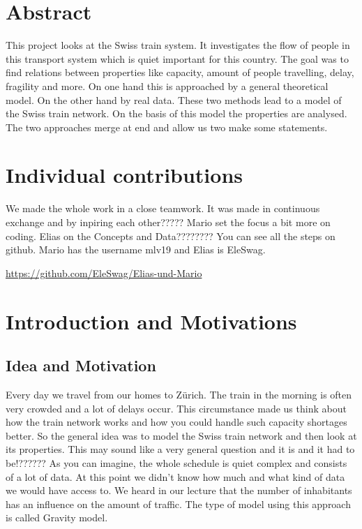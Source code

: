\documentclass[11pt]{article}
\begin{document}
\section{Abstract}

This project looks at the Swiss train system. It investigates the flow of people in this transport system which is quiet important for this country. The goal was to find relations between properties like capacity, amount of people travelling, delay, fragility and more. On one hand this is approached  by a general theoretical model. On the other hand by real data. These two methods lead to a model of the Swiss train  network. On the basis of this model the properties are analysed. The two approaches merge at end and allow us two make some statements.
 

\section{Individual contributions}

We made the whole work in a close teamwork. It was made in continuous exchange and by inpiring each other????? Mario set the focus a bit more on coding. Elias on the Concepts and Data???????? You can see all the steps on github. Mario has the username mlv19 and Elias is EleSwag.\newline

\url{https://github.com/EleSwag/Elias-und-Mario}

\section{Introduction and Motivations}

\subsection{Idea and Motivation}


Every day we travel from our homes to Z\"urich. The train in the morning is often very crowded and a lot of delays occur. This circumstance made us think about how the train network works and how you could handle such capacity shortages better. 
So the general idea was to model the Swiss train network and then look at its properties. This may sound like a very general question and it is and it had to be!?????? As you can imagine, the whole schedule is quiet complex and consists of a lot of data. At this point we didn't know how much and what kind of data we would have access to. We heard in our lecture that the number of inhabitants has an influence on the amount of traffic. The type of model using this approach is called Gravity model.
\end{document}
